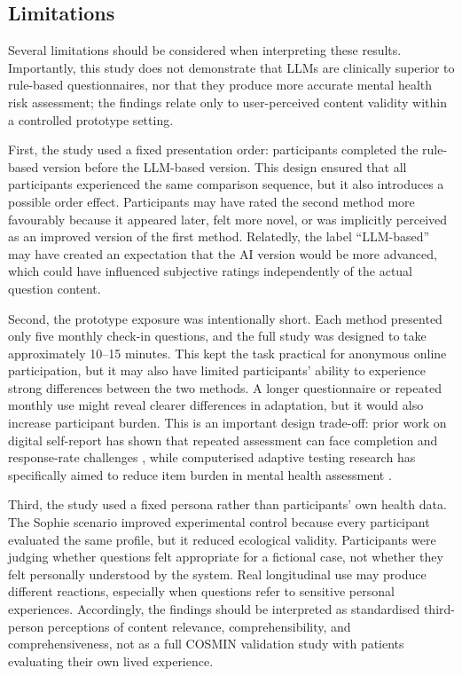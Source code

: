 \documentclass[conference]{IEEEtran}
\begin{document}
\subsection{Limitations}
\label{subsec:limitations}

Several limitations should be considered when interpreting these results.
Importantly, this study does not demonstrate that LLMs are clinically
superior to rule-based questionnaires, nor that they produce more accurate
mental health risk assessment; the findings relate only to user-perceived
content validity within a controlled prototype setting.

First, the study used a fixed presentation order: participants completed the
rule-based version before the LLM-based version. This design ensured that all
participants experienced the same comparison sequence, but it also introduces a
possible order effect. Participants may have rated the second method more
favourably because it appeared later, felt more novel, or was implicitly
perceived as an improved version of the first method. Relatedly, the label
``LLM-based'' may have created an expectation that the AI version would be more
advanced, which could have influenced subjective ratings independently of the
actual question content.

Second, the prototype exposure was intentionally short. Each method presented
only five monthly check-in questions, and the full study was designed to take
approximately 10--15 minutes. This kept the task practical for anonymous online
participation, but it may also have limited participants' ability to experience
strong differences between the two methods. A longer questionnaire or repeated
monthly use might reveal clearer differences in adaptation, but it would also
increase participant burden. This is an important design trade-off: prior work
on digital self-report has shown that repeated assessment can face completion
and response-rate challenges \cite{maatoug2021}, while computerised adaptive
testing research has specifically aimed to reduce item burden in mental health
assessment \cite{gibbons2008,choi2010}.

Third, the study used a fixed persona rather than participants' own health
data. The Sophie scenario improved experimental control because every
participant evaluated the same profile, but it reduced ecological validity.
Participants were judging whether questions felt appropriate for a fictional
case, not whether they felt personally understood by the system. Real
longitudinal use may produce different reactions, especially when questions
refer to sensitive personal experiences. Accordingly, the findings should be
interpreted as standardised third-person perceptions of content relevance,
comprehensibility, and comprehensiveness, not as a full COSMIN validation
study with patients evaluating their own lived experience.
\end{document}
